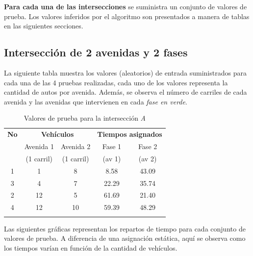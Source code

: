 \textbf{Para cada una de las intersecciones} se suministra un conjunto de valores de prueba. Los valores inferidos por el algoritmo son presentados a manera de tablas en las siguientes secciones.





\newpage
\subsection{Intersección de 2 avenidas y 2 fases}
La siguiente tabla muestra los valores (aleatorios) de entrada suministrados para cada una de las 4 pruebas realizadas, cada uno de los valores representa la cantidad de autos por avenida. Además, se observa el número de carriles de cada avenida y las avenidas que intervienen en cada \emph{fase en verde}.

\begin{longtable}[c]{ccccc} \toprule
	\textbf{No} &\multicolumn{2}{c}{\textbf{Vehículos}} & \multicolumn{2}{c}{\textbf{Tiempos asignados}} \\[0.2cm]
	&  Avenida 1 & Avenida 2 & Fase 1 & Fase 2 \\[0cm]
	&{\scriptsize(1 carril)}&{\scriptsize (1 carril)} &{\scriptsize (av 1)} &{\scriptsize(av 2)} \\[0.1cm]\midrule
	1 & 1 & 8 & 8.58 &43.09\\
	3 & 4 & 7 & 22.29 & 35.74\\
	2 & 12 & 5 & 61.69 & 21.40\\
	4 & 12 & 10 & 59.39 & 48.29\\\bottomrule
	\caption{Valores de prueba para la intersección \textit{A}}
\end{longtable}

Las siguientes gráficas representan los repartos de tiempo para cada conjunto de valores de prueba. A diferencia de una asignación estática, aquí se observa como los tiempos varían en función de la cantidad de vehículos.

